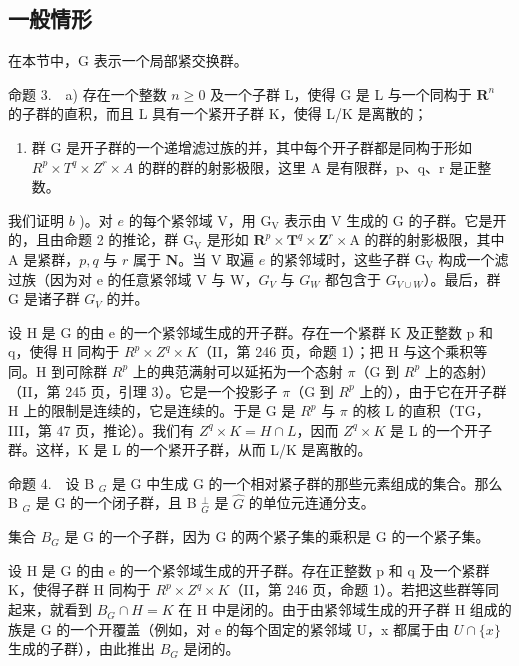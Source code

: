 \subsection{一般情形}

在本节中，G 表示一个局部紧交换群。

命题 3.　a) 存在一个整数 \(n \geqslant 0\) 及一个子群 L，使得 G 是 L 与一个同构于 \(\mathbf{R}^n\) 的子群的直积，而且 L 具有一个紧开子群 K，使得 L/K 是离散的；

\begin{enumerate}
\def\labelenumi{\alph{enumi})}
\setcounter{enumi}{1}
\tightlist
\item
  群 G 是开子群的一个递增滤过族的并，其中每个开子群都是同构于形如 \(R^{p} \times T^{q} \times Z^{r} \times A\) 的群的群的射影极限，这里 A 是有限群，p、q、r 是正整数。
\end{enumerate}

我们证明 \(b\) )。对 \(e\) 的每个紧邻域 V，用 \(\mathrm{G_V}\) 表示由 V 生成的 G 的子群。它是开的，且由命题 2 的推论，群 \(\mathrm{G_V}\) 是形如 \(\mathbf{R}^p\times \mathbf{T}^q\times \mathbf{Z}^r\times \mathrm{A}\) 的群的射影极限，其中 A 是紧群，\(p,q\) 与 \(r\) 属于 \(\mathbf{N}\)。当 V 取遍 \(e\) 的紧邻域时，这些子群 \(\mathrm{G_V}\) 构成一个滤过族（因为对 e 的任意紧邻域 V 与 W，\(G_{V}\) 与 \(G_{W}\) 都包含于 \(G_{V\cup W}\)）。最后，群 G 是诸子群 \(G_{V}\) 的并。

设 H 是 G 的由 e 的一个紧邻域生成的开子群。存在一个紧群 K 及正整数 p 和 q，使得 H 同构于 \(R^{p} \times Z^{q} \times K\)（II，第 246 页，命题 1）；把 H 与这个乘积等同。H 到可除群 \(R^{p}\) 上的典范满射可以延拓为一个态射 \(\pi\)（G 到 \(R^{p}\) 上的态射）（II，第 245 页，引理 3）。它是一个投影子 \(\pi\)（G 到 \(R^{p}\) 上的），由于它在开子群 H 上的限制是连续的，它是连续的。于是 G 是 \(R^{p}\) 与 \(\pi\) 的核 L 的直积（TG，III，第 47 页，推论）。我们有 \(Z^{q} \times K = H \cap L\)，因而 \(Z^{q} \times K\) 是 L 的一个开子群。这样，K 是 L 的一个紧开子群，从而 L/K 是离散的。

命题 4.　设 B \(_{G}\) 是 G 中生成 G 的一个相对紧子群的那些元素组成的集合。那么 B \(_{G}\) 是 G 的一个闭子群，且 B \(_{G}^{\perp}\) 是 \(\widehat{G}\) 的单位元连通分支。

集合 \(B_{G}\) 是 G 的一个子群，因为 G 的两个紧子集的乘积是 G 的一个紧子集。

设 H 是 G 的由 e 的一个紧邻域生成的开子群。存在正整数 p 和 q 及一个紧群 K，使得子群 H 同构于 \(R^{p} \times Z^{q} \times K\)（II，第 246 页，命题 1）。若把这些群等同起来，就看到 \(B_{G} \cap H = K\) 在 H 中是闭的。由于由紧邻域生成的开子群 H 组成的族是 G 的一个开覆盖（例如，对 e 的每个固定的紧邻域 U，x 都属于由 \(U \cap \{x\}\) 生成的子群），由此推出 \(B_{G}\) 是闭的。

